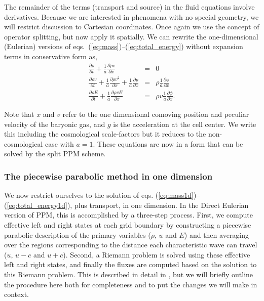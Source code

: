 The remainder of the terms (transport and source) in the fluid equations
involve derivatives.  
Because we are interested in phenomena with no special geometry, we will
restrict discussion to Cartesian coordinates.
Once again we use the concept of operator splitting,
but now apply it spatially.   We can rewrite the one-dimensional (Eulerian) 
versions of eqs.~(\ref{eq:mass})--(\ref{eq:total_energy}) without expansion terms
in conservative form as,
\begin{eqnarray}
\frac{\partial \rho}{\partial t}  + \frac{1}{a} \frac{\partial \rho v }{\partial x}    & = &  
     0 \label{eq:mass1d} \\
\frac{\partial \rho v}{\partial t}  + \frac{1}{a} \frac{\partial \rho v^2}{\partial x}   + 
      \frac{1}{a} \frac{\partial p}{ \partial x} & = & 
      \rho \frac{1}{a} \frac{\partial \phi}{ \partial x}  \label{eq:momentum1d}  \\
\frac{\partial \rho E}{\partial t}  + \frac{1}{a} \frac{\partial \rho v E}{\partial x}  & =  &
      \rho v \frac{1}{a} \frac{\partial \phi}{\partial x}. \label{eq:total_energy1d}
\end{eqnarray}

%
Note that $x$ and $v$ refer to the one dimensional comoving position and 
peculiar velocity of the baryonic gas, and $g$ is the acceleration at the cell center.
We write this including the cosmological scale-factors but it reduces to the non-cosmological case with $a = 1$.
These equations are now in a form that can be solved by the split PPM scheme.


\subsubsection{The piecewise parabolic method in one dimension} %

We now restrict ourselves to the solution of eqs. (\ref{eq:mass1d})--(\ref{eq:total_energy1d}), plus transport, in one dimension.  In the Direct Eulerian version of PPM, this is accomplished by a three-step process.  First, we compute effective left and right states at each grid boundary by constructing a piecewise parabolic description of the primary variables ($\rho$, $u$ and $E$) and then averaging over the regions corresponding to the distance each characteristic wave can travel ($u$, $u-c$ and $u+c$).  Second, a Riemann problem is solved using these effective left and right states, and finally the fluxes are computed based on the solution to this Riemann problem.  This is described in detail in \citet{1984JCoPh..54..174C}, but we will briefly outline the procedure here both for completeness and to put the changes we will make in context.

